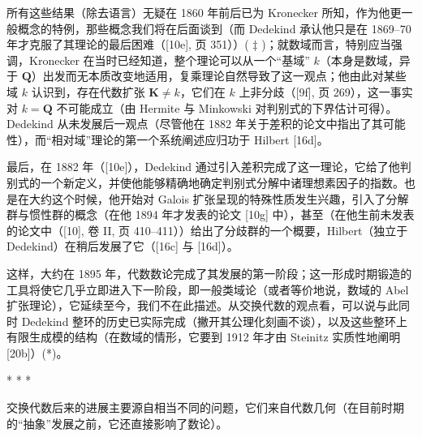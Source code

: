 所有这些结果（除去语言）无疑在 1860 年前后已为 Kronecker 所知，作为他更一般概念的特例，那些概念我们将在后面谈到（而 Dedekind 承认他只是在 1869–70 年才克服了其理论的最后困难（{[}10e{]}, 页 351））( \(\ddagger\) )；就数域而言，特别应当强调，Kronecker 在当时已经知道，整个理论可以从一个“基域” \(k\)（本身是数域，异于 \(\mathbf{Q}\)）出发而无本质改变地适用，复乘理论自然导致了这一观点；他由此对某些域 \(k\) 认识到，存在代数扩张 \(\mathbf{K} \neq k\)，它们在 \(k\) 上非分歧（{[}9f{]}, 页 269），这一事实对 \(k = \mathbf{Q}\) 不可能成立（由 Hermite 与 Minkowski 对判别式的下界估计可得）。Dedekind 从未发展后一观点（尽管他在 1882 年关于差积的论文中指出了其可能性），而“相对域”理论的第一个系统阐述应归功于 Hilbert {[}16d{]}。

最后，在 1882 年（{[}10e{]}），Dedekind 通过引入差积完成了这一理论，它给了他判别式的一个新定义，并使他能够精确地确定判别式分解中诸理想素因子的指数。也是在大约这个时候，他开始对 Galois 扩张呈现的特殊性质发生兴趣，引入了分解群与惯性群的概念（在他 1894 年才发表的论文 {[}10g{]} 中），甚至（在他生前未发表的论文中（{[}10{]}, 卷 II, 页 410–411））给出了分歧群的一个概要，Hilbert（独立于 Dedekind）在稍后发展了它（{[}16c{]} 与 {[}16d{]}）。

这样，大约在 1895 年，代数数论完成了其发展的第一阶段；这一形成时期锻造的工具将使它几乎立即进入下一阶段，即一般类域论（或者等价地说，数域的 Abel 扩张理论），它延续至今，我们不在此描述。从交换代数的观点看，可以说与此同时 Dedekind 整环的历史已实际完成（撇开其公理化刻画不谈），以及这些整环上有限生成模的结构（在数域的情形，它要到 1912 年才由 Steinitz 实质性地阐明{[}20b{]}）(*)。

\begin{center}* * *\end{center}

交换代数后来的进展主要源自相当不同的问题，它们来自代数几何（在目前时期的“抽象”发展之前，它还直接影响了数论）。

